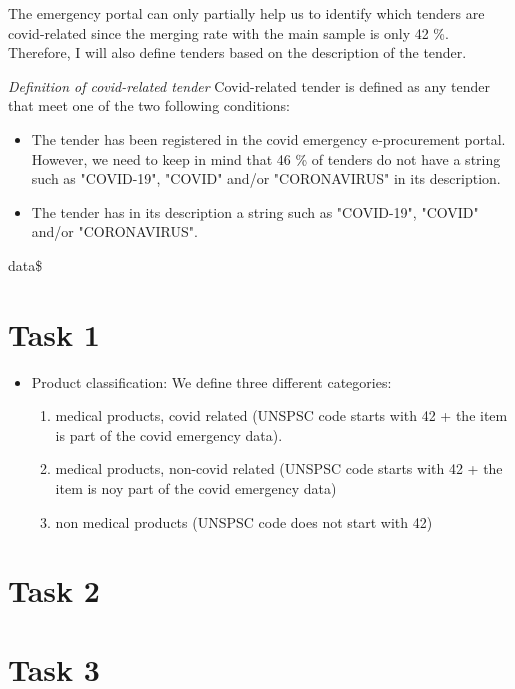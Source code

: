 \documentclass[
]{article}
\begin{document}
The emergency portal can only partially help us to identify which
tenders are covid-related since the merging rate with the main sample is
only 42 \%. Therefore, I will also define tenders based on the
description of the tender.

\emph{Definition of covid-related tender} Covid-related tender is
defined as any tender that meet one of the two following conditions:

\begin{itemize}
  \item The tender has been registered in the covid emergency e-procurement portal. However, we need to keep in mind that 46 \% of tenders do not have a string such as "COVID-19", "COVID" and/or "CORONAVIRUS" in its description.  
  \item The tender has in its description a string such as "COVID-19", "COVID" and/or "CORONAVIRUS".  
\end{itemize}

data\$

\hypertarget{task-1}{%
\section{Task 1}\label{task-1}}

\begin{itemize}
  \item Product classification: We define three different categories: 
  \begin{enumerate}
    \item medical products, covid related (UNSPSC code starts with 42 + the item is part of the covid emergency data).
    \item medical products, non-covid related (UNSPSC code starts with 42 + the item is noy part of the covid emergency data)
    \item non medical products (UNSPSC code does not start with 42)
  \end{enumerate}
\end{itemize}

\hypertarget{task-2}{%
\section{Task 2}\label{task-2}}

\hypertarget{task-3}{%
\section{Task 3}\label{task-3}}
\end{document}
